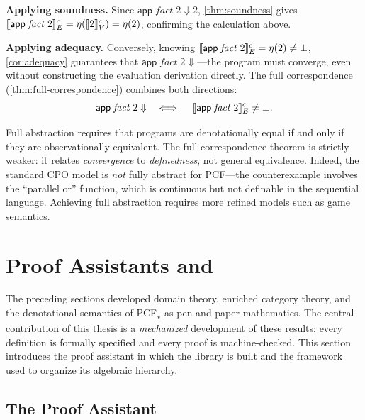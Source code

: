 \medskip\noindent
\textbf{Applying soundness.}\;
Since $\mathsf{app}\;\mathit{fact}\;2 \Downarrow 2$,
\cref{thm:soundness} gives
$\llbracket \mathsf{app}\;\mathit{fact}\;2 \rrbracket^c_E = \eta(\llbracket 2 \rrbracket^c_V) = \eta(2)$,
confirming the calculation above.

\medskip\noindent
\textbf{Applying adequacy.}\;
Conversely, knowing $\llbracket \mathsf{app}\;\mathit{fact}\;2 \rrbracket^c_E = \eta(2)
\neq \bot$, \cref{cor:adequacy} guarantees that
$\mathsf{app}\;\mathit{fact}\;2 \Downarrow$---the program must converge,
even without constructing the evaluation derivation directly.  The full
correspondence (\cref{thm:full-correspondence}) combines both directions:
\[
  \mathsf{app}\;\mathit{fact}\;2 \Downarrow
  \quad\iff\quad
  \llbracket \mathsf{app}\;\mathit{fact}\;2 \rrbracket^c_E \neq \bot.
\]

\begin{remark}
\label{rem:not-full-abstraction}
Full abstraction requires that programs are denotationally equal if and
only if they are observationally equivalent.  The full correspondence
theorem is strictly weaker: it relates \emph{convergence} to
\emph{definedness}, not general equivalence.  Indeed, the standard
CPO model is \emph{not} fully abstract for PCF---the counterexample
involves the ``parallel or'' function, which is continuous but not
definable in the sequential language.  Achieving full abstraction
requires more refined models such as game semantics.
\end{remark}

\section{Proof Assistants and \Rocq{}}
\label{sec:bg-rocq}

The preceding sections developed domain theory, enriched category theory,
and the denotational semantics of PCF\textsubscript{v} as pen-and-paper
mathematics.  The central contribution of this thesis is a
\emph{mechanized} development of these results: every definition is
formally specified and every proof is machine-checked.  This section
introduces the proof assistant in which the library is built and the
framework used to organize its algebraic hierarchy.

\subsection{The \Rocq{} Proof Assistant}
\label{sec:bg-rocq-assistant}

